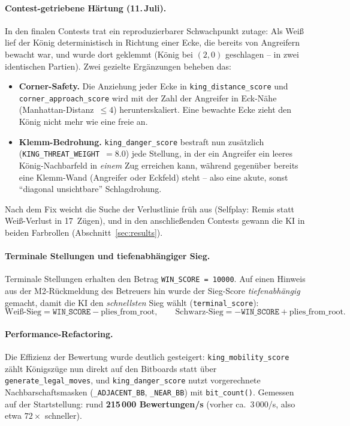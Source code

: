 \documentclass[11pt,a4paper]{article}
\newcommand{\code}[1]{\texttt{\small #1}}
\begin{document}
\paragraph{Contest-getriebene H\"artung (11.\,Juli).}
In den finalen Contests trat ein reproduzierbarer Schwachpunkt zutage: Als Wei\ss{}
lief der K\"onig deterministisch in Richtung einer Ecke, die bereits von Angreifern
bewacht war, und wurde dort geklemmt (K\"onig bei $(2,0)$ geschlagen -- in zwei
identischen Partien).
Zwei gezielte Erg\"anzungen beheben das:
\begin{itemize}
\item \textbf{Corner-Safety.} Die Anziehung jeder Ecke in \code{king\_distance\_score}
  und \code{corner\_approach\_score} wird mit der Zahl der Angreifer in Eck-N\"ahe
  (Manhattan-Distanz~$\le 4$) herunterskaliert. Eine bewachte Ecke zieht den K\"onig
  nicht mehr wie eine freie an.
\item \textbf{Klemm-Bedrohung.} \code{king\_danger\_score} bestraft nun zus\"atzlich
  (\code{KING\_THREAT\_WEIGHT}~$=8.0$) jede Stellung, in der ein Angreifer ein leeres
  K\"onig-Nachbarfeld in \emph{einem} Zug erreichen kann, w\"ahrend gegen\"uber bereits
  eine Klemm-Wand (Angreifer oder Eckfeld) steht -- also eine akute, sonst
  ``diagonal unsichtbare'' Schlagdrohung.
\end{itemize}
Nach dem Fix weicht die Suche der Verlustlinie fr\"uh aus (Selfplay: Remis statt
Wei\ss-Verlust in 17~Z\"ugen), und in den anschlie\ss enden Contests gewann die KI in
beiden Farbrollen (Abschnitt~\ref{sec:results}).

\paragraph{Terminale Stellungen und tiefenabh\"angiger Sieg.}
Terminale Stellungen erhalten den Betrag \code{WIN\_SCORE = 10000}.
Auf einen Hinweis aus der M2-R\"uckmeldung des Betreuers hin wurde der Sieg-Score
\emph{tiefenabh\"angig} gemacht, damit die KI den \emph{schnellsten} Sieg w\"ahlt
(\code{terminal\_score}):
\[
\text{Wei\ss-Sieg} = \texttt{WIN\_SCORE} - \text{plies\_from\_root},\qquad
\text{Schwarz-Sieg} = -\texttt{WIN\_SCORE} + \text{plies\_from\_root}.
\]

\paragraph{Performance-Refactoring.}
Die Effizienz der Bewertung wurde deutlich gesteigert: \code{king\_mobility\_score}
z\"ahlt K\"onigsz\"uge nun direkt auf den Bitboards statt \"uber
\code{generate\_legal\_moves}, und \code{king\_danger\_score} nutzt vorgerechnete
Nachbarschaftsmasken (\code{\_ADJACENT\_BB}, \code{\_NEAR\_BB}) mit
\code{bit\_count()}.
Gemessen auf der Startstellung: rund \textbf{215\,000 Bewertungen/s}
(vorher ca.\ 3\,000/s, also etwa $72\times$ schneller).
\end{document}
